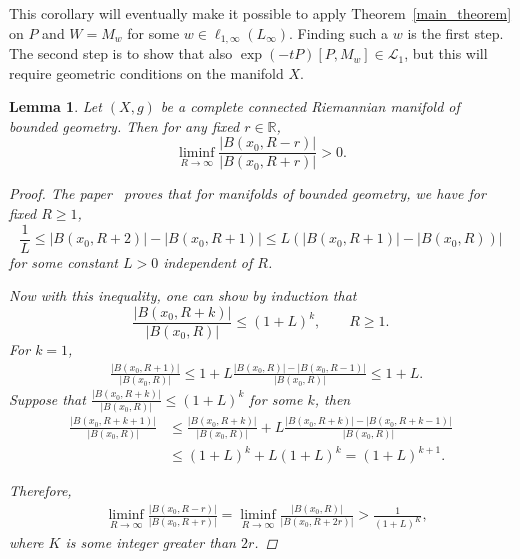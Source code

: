 \documentclass[pdftex]{sigma}
\numberwithin{equation}{section}
\newtheorem{Lemma}[Theorem]{Lemma}
\newcommand{\abs}[1]{\lvert#1\rvert}
\begin{document}
This corollary will eventually make it possible to apply Theorem~\ref{main_theorem} on $P$ and $W = M_w$ for some $w \in \ell_{1,\infty}(L_\infty)$. Finding such a $w$ is the first step. The second step is to show that also $\exp(-tP)[P,M_w] \in \mathcal{L}_1$, but this will require geometric conditions on the manifold $X$.

\begin{Lemma}\label{Grimaldi}
Let $(X,g)$ be a complete connected Riemannian manifold of bounded geometry. Then for any fixed $r\in \mathbb{R}$,
\[
\liminf_{R \to \infty} \frac{ \abs{B(x_0, R-r)}}{ \abs{B(x_0, R+r)}} > 0.
\]
\begin{proof}
The paper~\cite{GrimaldiPansu2011} proves that for manifolds of bounded geometry, we have for fixed $R\geq 1$,
\[
\frac{1}{L} \leq \abs{B(x_0, R+2)}-\abs{B(x_0, R+1)} \leq L(\abs{B(x_0, R+1)} - \abs{B(x_0, R))}
\]
for some constant $L>0$ independent of $R$.

Now with this inequality, one can show by induction that
\[
\frac{\abs{B(x_0,R+k)}}{\abs{B(x_0,R)}} \leq (1+L)^k, \qquad R \geq 1.
\] For $k=1$,
\begin{align*}
& \frac{\abs{B(x_0,R+1)}}{\abs{B(x_0,R)}}\leq 1 + L \frac{\abs{B(x_0,R)} - \abs{B(x_0,R-1)}}{\abs{B(x_0,R)}}\leq 1 + L.
\end{align*}
Suppose that $\frac{\abs{B(x_0,R+k)}}{\abs{B(x_0,R)}} \leq (1+L)^k$ for some $k$, then \begin{align*}
 \frac{\abs{B(x_0,R+k+1)}}{\abs{B(x_0,R)}} &\leq \frac{\abs{B(x_0,R+k)}}{\abs{B(x_0,R)}} + L \frac{\abs{B(x_0,R+k)} - \abs{B(x_0,R+k-1)}}{\abs{B(x_0,R)}}\\
 &\leq (1+L)^k + L (1+L)^k = (1+L)^{k+1}.
\end{align*}

Therefore,
\begin{align*}
 &\liminf_{R \to \infty} \frac{ \abs{B(x_0, R-r)}}{ \abs{B(x_0, R+r)}} = \liminf_{R \to \infty} \frac{ \abs{B(x_0, R)}}{ \abs{B(x_0, R+2r)}} > \frac{1}{(1+L)^K},
\end{align*}
where $K$ is some integer greater than $2r$.
\end{proof}
\end{Lemma}
\end{document}
